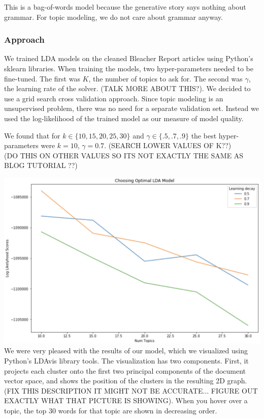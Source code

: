 \documentclass[11pt]{article}
\begin{document}
This is a bag-of-words model because the generative story says nothing about grammar. For topic modeling, we do not care about grammar anyway.    

\subsubsection{Approach}
We trained LDA models on the cleaned Bleacher Report articles using Python's sklearn libraries.  When training the models, two hyper-parameters needed to be fine-tuned. The first was $K$, the number of topics to ask for.  The second was $\gamma$, the learning rate of the solver.  (TALK MORE ABOUT THIS?). We decided to use a grid search cross validation approach. Since topic modeling is an unsupervised problem, there was no need for a separate validation set.  Instead we used the log-likelihood of the trained model as our measure of model quality. 

We found that for $k \in \{10, 15, 20, 25, 30\}$ and $\gamma \in \{.5, .7, .9\}$ the best hyper-parameters were $k=10$, $\gamma = 0.7$. (SEARCH LOWER VALUES OF K??)\\

(DO THIS ON OTHER VALUES SO ITS NOT EXACTLY THE SAME AS BLOG TUTORIAL ??)


\includegraphics{gridsearch.png} \\
We were very pleased with the results of our model, which we visualized using Python's LDAvis library tools. 
The visualization has two components. First, it projects each cluster onto the first two principal components of the document vector space, and shows the position of the clusters in the resulting 2D graph.   (FIX THIS DESCRIPTION IT MIGHT NOT BE ACCURATE... FIGURE OUT EXACTLY WHAT THAT PICTURE IS SHOWING). When you hover over a topic, the top 30 words for that topic are shown in decreasing order. 
\end{document}
